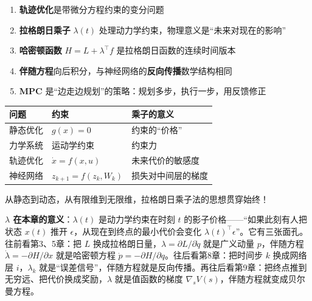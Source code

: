 \begin{enumerate}
    \item \textbf{轨迹优化}是带微分方程约束的变分问题
    
    \item \textbf{拉格朗日乘子} $\lambda(t)$ 处理动力学约束，物理意义是“未来对现在的影响”
    
    \item \textbf{哈密顿函数} $H = L + \lambda^\top f$ 是拉格朗日函数的连续时间版本
    
    \item \textbf{伴随方程}向后积分，与神经网络的\textbf{反向传播}数学结构相同
    
    \item \textbf{MPC} 是“边走边规划”的策略：规划多步，执行一步，用反馈修正
\end{enumerate}

\begin{unification}[title=统一视角：约束优化无处不在]
\begin{center}
\begin{tabular}{lll}
\toprule
\textbf{问题} & \textbf{约束} & \textbf{乘子的意义} \\
\midrule
静态优化 & $g(x) = 0$ & 约束的“价格” \\
力学系统 & 运动学约束 & 约束力 \\
轨迹优化 & $\dot{x} = f(x, u)$ & 未来代价的敏感度 \\
神经网络 & $z_{k+1} = f(z_k, W_k)$ & 损失对中间层的梯度 \\
\bottomrule
\end{tabular}
\end{center}

从静态到动态，从有限维到无限维，拉格朗日乘子法的思想贯穿始终！
\end{unification}

\begin{physicalmeaning}
\textbf{$\lambda$ 在本章的意义}：$\lambda(t)$ 是动力学约束在时刻 $t$ 的影子价格——“如果此刻有人把状态 $x(t)$ 推开 $\epsilon$，从现在到终点的最小代价会变化 $\lambda(t)^\top \epsilon$”。它有三张面孔。往前看第3、5章：把 $L$ 换成拉格朗日量，$\lambda = \partial L/\partial \dot{q}$ 就是广义动量 $p$，伴随方程 $\dot{\lambda} = -\partial H/\partial x$ 就是哈密顿方程 $\dot{p} = -\partial H/\partial q$。往后看第8章：把时间步 $k$ 换成网络层 $i$，$\lambda_k$ 就是“误差信号”，伴随方程就是反向传播。再往后看第9章：把终点推到无穷远、把代价换成奖励，$\lambda$ 就是值函数的梯度 $\nabla_s V(s)$，伴随方程就变成贝尔曼方程。
\end{physicalmeaning}


